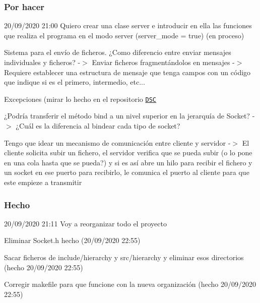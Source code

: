 \subsubsection*{Por hacer}


\begin{DoxyItemize}
\item 20/09/2020 21\+:00 Quiero crear una clase server e introducir en ella las funciones que realiza el programa en el modo server (server\+\_\+mode = true) (en proceso)
\item Sistema para el envío de ficheros. ¿\+Como diferencio entre enviar mensajes individuales y ficheros? -\/$>$ Enviar ficheros fragmentándolos en mensajes -\/$>$ Requiere establecer una estructura de mensaje que tenga campos con un código que indique si es el primero, intermedio, etc...
\item Excepciones (mirar lo hecho en el repositorio \href{https://github.com/miguel-martinr/Data-Structure-Classes}{\tt D\+SC}
\item ¿\+Podría transferir el método bind a un nivel superior en la jerarquía de Socket? -\/$>$ ¿\+Cuál es la diferencia al bindear cada tipo de socket?
\item Tengo que idear un mecanismo de comunicación entre cliente y servidor -\/$>$ El cliente solicita subir un fichero, el servidor verifica que se pueda subir (o lo pone en una cola hasta que se pueda?) y si es así abre un hilo para recibir el fichero y un socket en ese puerto para recibirlo, le comunica el puerto al cliente para que este empieze a transmitir
\end{DoxyItemize}

\subsubsection*{Hecho}


\begin{DoxyItemize}
\item 20/09/2020 21\+:11 Voy a reorganizar todo el proyecto
\begin{DoxyItemize}
\item Eliminar Socket.\+h hecho (20/09/2020 22\+:55)
\item Sacar ficheros de include/hierarchy y src/hierarchy y eliminar esos directorios (hecho 20/09/2020 22\+:55)
\item Corregir makefile para que funcione con la nueva organización (hecho 20/09/2020 22\+:55)
\end{DoxyItemize}
\end{DoxyItemize}


